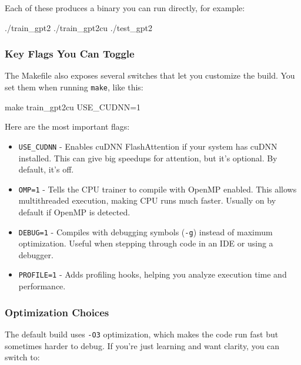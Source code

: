 \documentclass[
  letterpaper,
  DIV=11,
  numbers=noendperiod]{scrreprt}
\newenvironment{Shaded}{\begin{snugshade}}{\end{snugshade}}
\newcommand{\ExtensionTok}[1]{\textcolor[rgb]{0.00,0.23,0.31}{#1}}
\newcommand{\FunctionTok}[1]{\textcolor[rgb]{0.28,0.35,0.67}{#1}}
\newcommand{\NormalTok}[1]{\textcolor[rgb]{0.00,0.23,0.31}{#1}}
\providecommand{\tightlist}{%
  \setlength{\itemsep}{0pt}\setlength{\parskip}{0pt}}
\begin{document}
Each of these produces a binary you can run directly, for example:

\begin{Shaded}
\begin{Highlighting}[]
\ExtensionTok{./train\_gpt2}
\ExtensionTok{./train\_gpt2cu}
\ExtensionTok{./test\_gpt2}
\end{Highlighting}
\end{Shaded}

\subsubsection{Key Flags You Can Toggle}\label{key-flags-you-can-toggle}

The Makefile also exposes several switches that let you customize the
build. You set them when running \texttt{make}, like this:

\begin{Shaded}
\begin{Highlighting}[]
\FunctionTok{make}\NormalTok{ train\_gpt2cu USE\_CUDNN=1}
\end{Highlighting}
\end{Shaded}

Here are the most important flags:

\begin{itemize}
\tightlist
\item
  \texttt{USE\_CUDNN} - Enables cuDNN FlashAttention if your system has
  cuDNN installed. This can give big speedups for attention, but it's
  optional. By default, it's off.
\item
  \texttt{OMP=1} - Tells the CPU trainer to compile with OpenMP enabled.
  This allows multithreaded execution, making CPU runs much faster.
  Usually on by default if OpenMP is detected.
\item
  \texttt{DEBUG=1} - Compiles with debugging symbols (\texttt{-g})
  instead of maximum optimization. Useful when stepping through code in
  an IDE or using a debugger.
\item
  \texttt{PROFILE=1} - Adds profiling hooks, helping you analyze
  execution time and performance.
\end{itemize}

\subsubsection{Optimization Choices}\label{optimization-choices}

The default build uses \texttt{-O3} optimization, which makes the code
run fast but sometimes harder to debug. If you're just learning and want
clarity, you can switch to:
\end{document}
